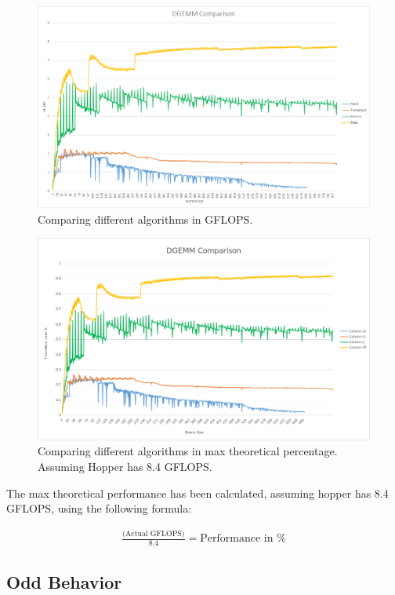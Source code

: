 \documentclass[a4paper.11pt,oneside]{book}
\begin{document}
\begin{figure}[H]
  \centering
  \includegraphics[width=0.9\linewidth]{comparison-graph.png}
  \caption{Comparing different algorithms in GFLOPS.}
  \centering
  \label{fig:sub1}
\end{figure}
\begin{figure}[H]
  \centering
  \includegraphics[width=0.9\linewidth]{comparison-graph-percentage.png}
  \caption{Comparing different algorithms in max theoretical percentage. 
           Assuming Hopper has 8.4 GFLOPS.}
  \centering
  \label{fig:sub1}
\end{figure}

The max theoretical performance has been calculated, assuming hopper has 8.4
GFLOPS, using the following formula:

\begin{align*}
\frac{\text{(Actual GFLOPS)}}{8.4} = \text{Performance in \%}
\end{align*}

\subsection{Odd Behavior}
\end{document}
